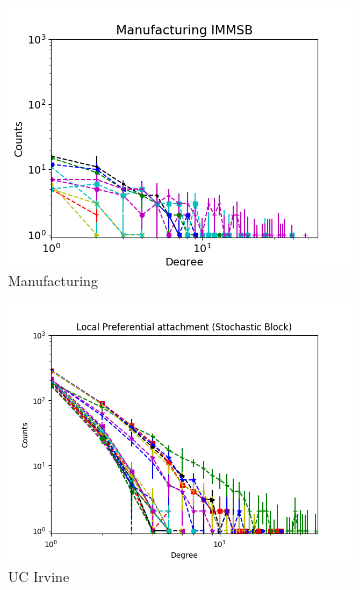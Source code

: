 \begin{figure}[h]
\begin{subfigure}[b]{0.300\textwidth}
            \includegraphics[width=\textwidth]{img/corpus/immsb_manufacturing_1}
            \caption {{\small Manufacturing}}    
        \end{subfigure}
        \begin{subfigure}[b]{0.300\textwidth}
            \centering
            \includegraphics[width=\textwidth]{img/corpus/immsb_ucirvine_1}
            \caption {{\small UC Irvine}}    
            \label{fig:mean and std of net14}
        \end{subfigure}
        \begin{subfigure}[b]{0.300\textwidth}
            \centering

\end{subfigure}
\end{figure}
